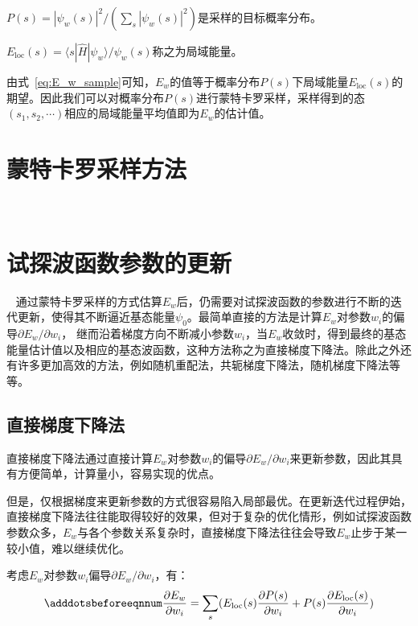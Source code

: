 $P(s)=|\psi_{w}(s)|^{2} /(\sum\limits_{s}|\psi_{w}(s)|^{2})$是采样的目标概率分布。

$E_{\text{loc}}(s)=\langle s|\hat{H}|\psi_{w}\rangle/\psi_{w}(s)$称之为局域能量。

由式~\eqref{eq:E_w_sample}可知，$E_w$的值等于概率分布$P(s)$下局域能量$E_{\text{loc}}(s)$的期望。因此我们可以对概率分布$P(s)$进行蒙特卡罗采样，采样得到的态$(s_1, s_2, \cdots)$相应的局域能量平均值即为$E_w$的估计值。

\section{蒙特卡罗采样方法} ~\label{sec:Monte_Carlo_sample_method}

\section{试探波函数参数的更新} ~\label{sec:update_trial_function_method}
通过蒙特卡罗采样的方式估算$E_w$后，仍需要对试探波函数的参数进行不断的迭代更新，使得其不断逼近基态能量$\psi_0$。最简单直接的方法是计算$E_w$对参数$w_i$的偏导$\partial E_{w}/\partial w_{i}$，
继而沿着梯度方向不断减小参数$w_i$，当$E_w$收敛时，得到最终的基态能量估计值以及相应的基态波函数，这种方法称之为直接梯度下降法。除此之外还有许多更加高效的方法，例如随机重配法\citep{sorella2001generalized}，共轭梯度下降法，随机梯度下降法等等。
\subsection{直接梯度下降法}
直接梯度下降法通过直接计算$E_w$对参数$w_i$的偏导$\partial E_{w}/\partial w_{i}$来更新参数，因此其具有方便简单，计算量小，容易实现的优点。

但是，仅根据梯度来更新参数的方式很容易陷入局部最优。在更新迭代过程伊始，直接梯度下降法往往能取得较好的效果，但对于复杂的优化情形，例如试探波函数
参数众多，$E_{w}$与各个参数关系复杂时，直接梯度下降法往往会导致$E_{w}$止步于某一较小值，难以继续优化。

考虑$E_w$对参数$w_i$偏导$\partial E_{w}/\partial w_{i}$，有：
\begin{equation} \label{eq:E_w_partial}
    \adddotsbeforeeqnnum%
    \frac{\partial E_w}{\partial w_i} = \sum_{s} (E_{\text{loc}}(s)\frac{\partial P(s)}{\partial w_i} + P(s)\frac{\partial E_{\text{loc}}(s)}{\partial w_i})
\end{equation}


